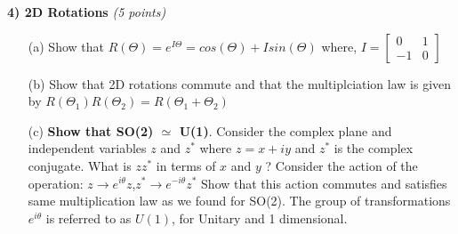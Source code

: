 {\vspace*{0.25in}



\textbf{4) 2D Rotations } \hfill \textit{(5 points)}
\begin{itemize}
\item[(a)]Show that $R(\Theta) = e^{I\Theta} = cos(\Theta)+ I sin(\Theta)$
where, $I =  \begin{bmatrix}
    0 & 1  \\
    -1 & 0
  \end{bmatrix} $

\item[(b)]Show that 2D rotations commute and that the multiplciation law is given by $R(\Theta_{1})R(\Theta_{2}) = R(\Theta_{1} + \Theta_{2})$
\item[(c)]\textbf{Show that SO(2) $\simeq$ U(1)}. Consider the complex plane and independent variables $z$ and $z^*$ where $z = x+iy$ and $z^*$ is the complex conjugate.
What is $zz^*$ in terms of $x$ and $y$ ?
Consider the action of the operation: $z\rightarrow e^{i\theta}z$,$z^*\rightarrow e^{-i\theta}z^*$
Show that this action commutes and satisfies same multiplication law as we found for SO(2).
The group of transformations $e^{i\theta}$ is referred to as $U(1)$,  for Unitary and 1 dimensional.

\end{itemize}
}

\vspace*{0.25in}

